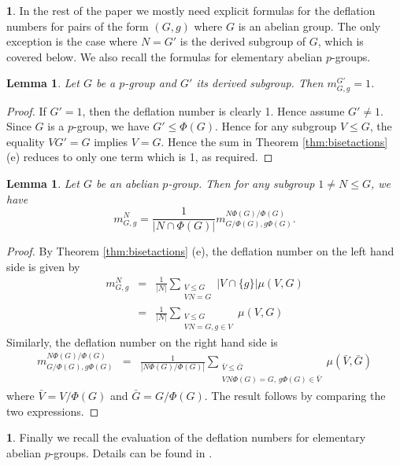 \documentclass[12pt]{article}
\theoremstyle{plain}
\newtheorem{lemma}[theorem]{Lemma}
\theoremstyle{definition}
\newtheorem{nothing}[theorem]{}
\begin{document}
\begin{nothing}
    In the rest of the paper we mostly need explicit formulas for the deflation numbers for pairs of the form $(G, g)$ where $G$ is an abelian group. The only exception is the case where $N=G'$ is the derived subgroup of $G$, which is covered below. We also recall the formulas for elementary abelian $p$-groups.     
\end{nothing}
\begin{lemma}\label{lem:defnoderived}
    Let $G$ be a $p$-group and $G'$ its derived subgroup. Then $m_{G, g}^{G'} = 1$.
\end{lemma}
\begin{proof}
    If $G'=1$, then the deflation number is clearly 1. Hence assume $G'\not = 1$. Since $G$ is a $p$-group, we have $G'\le \Phi(G)$. Hence for any subgroup $V\le G$, the equality $VG' = G$ implies $V = G$. Hence the sum in Theorem \ref{thm:bisetactions} (e) reduces to only one term which is 1, as required.
\end{proof}
\begin{lemma}\label{lem:defnoFrat}
    Let $G$ be an abelian $p$-group. Then for any subgroup $1\not = N\le G$, we have
    \[
    m_{G, g}^N =\frac{1}{|N\cap \Phi(G)|} m_{G/\Phi(G), g\Phi(G)}^{N\Phi(G)/\Phi(G)}.
    \]
\end{lemma}
\begin{proof}
    By Theorem \ref{thm:bisetactions} (e), the deflation number on the left hand side is given by
    \begin{eqnarray*}
m_{G, g}^{N} &=& \frac{1}{|N|}\sum_{\substack{V\le G\\ VN = G}} |V\cap \{g\}|\mu(V, G)\\
    &=& \frac{1}{|N|}\sum_{\substack{V\le G\\ VN = G, g\in V}} \mu(V, G)        
    \end{eqnarray*}
Similarly, the deflation number on the right hand side is
  \begin{eqnarray*}
    m_{G/\Phi(G), g\Phi(G)}^{N\Phi(G)/\Phi(G)}  &=& \frac{1}{|N\Phi(G)/\Phi(G)|}\sum_{\substack{\bar V\le \bar G\\ VN\Phi(G) = G,\, g\Phi(G)\in \bar V}} \mu(\bar V, \bar G)
    \end{eqnarray*}
 where $\bar V = V/\Phi(G)$ and $\bar G= G/\Phi(G)$.
    The result follows by comparing the two expressions.
\end{proof}
\begin{nothing}
    Finally we recall the evaluation of the deflation numbers for elementary abelian $p$-groups. Details can be found in \cite{CoYi}.
\end{nothing}
\end{document}
